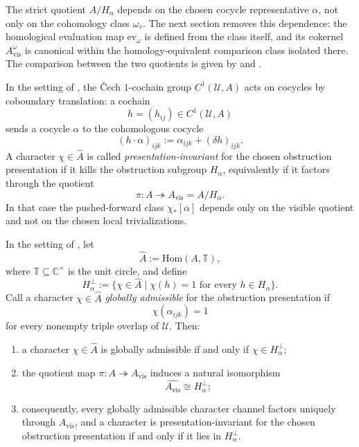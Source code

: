 The strict quotient $A/H_\alpha$ depends on the chosen cocycle representative $\alpha$, not only on the cohomology class $\omega_v$. The next section removes this dependence: the homological evaluation map $\mathrm{ev}_\omega$ is defined from the class itself, and its cokernel $A_{\mathrm{vis}}^\omega$ is canonical within the homology-equivalent comparison class isolated there. The comparison between the two quotients is given by  and .

\begin{definition}\label{def:gauge-invariance-character}
In the setting of , the \v{C}ech $1$-cochain group $C^1(\mathcal U,A)$ acts on cocycles by coboundary translation: a cochain
\[
h=(h_{ij})\in C^1(\mathcal U,A)
\]
sends a cocycle $\alpha$ to the cohomologous cocycle
\[
(h\cdot\alpha)_{ijk}:=\alpha_{ijk}+(\delta h)_{ijk}.
\]
A character $\chi\in\widehat A$ is called \emph{presentation-invariant} for the chosen obstruction presentation if it kills the obstruction subgroup $H_\alpha$, equivalently if it factors through the quotient
\[
\pi:A\twoheadrightarrow A_{\mathrm{vis}}=A/H_\alpha.
\]
In that case the pushed-forward class $\chi_*[\alpha]$ depends only on the visible quotient and not on the chosen local trivializations.
\end{definition}

\begin{proposition}\label{thm:character-definability-barrier}
In the setting of , let
\[
\widehat A:=\mathrm{Hom}(A,\mathbb T),
\]
where $\mathbb T\subseteq\mathbb C^\times$ is the unit circle, and define
\[
H_\alpha^\perp:=\{\chi\in\widehat A\mid \chi(h)=1\text{ for every }h\in H_\alpha\}.
\]
Call a character $\chi\in\widehat A$ \emph{globally admissible} for the obstruction presentation if
\[
\chi(\alpha_{ijk})=1
\]
for every nonempty triple overlap of $\mathcal U$. Then:
\begin{enumerate}[label=(\roman*),nosep]
\item a character $\chi\in\widehat A$ is globally admissible if and only if $\chi\in H_\alpha^\perp$;
\item the quotient map $\pi:A\twoheadrightarrow A_{\mathrm{vis}}$ induces a natural isomorphism
\[
\widehat{A_{\mathrm{vis}}}\cong H_\alpha^\perp;
\]
\item consequently, every globally admissible character channel factors uniquely through $A_{\mathrm{vis}}$, and a character is presentation-invariant for the chosen obstruction presentation if and only if it lies in $H_\alpha^\perp$.
\end{enumerate}
\end{proposition}


